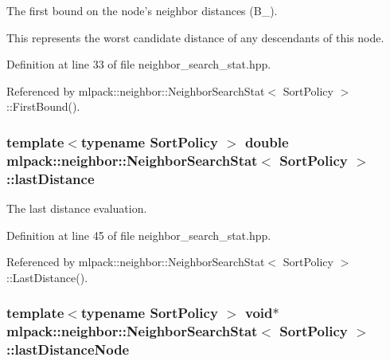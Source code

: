 The first bound on the node's neighbor distances (B\-\_). 

This represents the worst candidate distance of any descendants of this node. 

Definition at line 33 of file neighbor\-\_\-search\-\_\-stat.\-hpp.



Referenced by mlpack\-::neighbor\-::\-Neighbor\-Search\-Stat$<$ Sort\-Policy $>$\-::\-First\-Bound().

\subsubsection[{last\-Distance}]{\setlength{\rightskip}{0pt plus 5cm}template$<$typename Sort\-Policy $>$ double {\bf mlpack\-::neighbor\-::\-Neighbor\-Search\-Stat}$<$ Sort\-Policy $>$\-::last\-Distance\hspace{0.3cm}{\ttfamily [private]}}\label{classmlpack_1_1neighbor_1_1NeighborSearchStat_ac009992f1081ef962a16023f8e00c691}


The last distance evaluation. 



Definition at line 45 of file neighbor\-\_\-search\-\_\-stat.\-hpp.



Referenced by mlpack\-::neighbor\-::\-Neighbor\-Search\-Stat$<$ Sort\-Policy $>$\-::\-Last\-Distance().

\subsubsection[{last\-Distance\-Node}]{\setlength{\rightskip}{0pt plus 5cm}template$<$typename Sort\-Policy $>$ void$\ast$ {\bf mlpack\-::neighbor\-::\-Neighbor\-Search\-Stat}$<$ Sort\-Policy $>$\-::last\-Distance\-Node\hspace{0.3cm}{\ttfamily [private]}}\label{classmlpack_1_1neighbor_1_1NeighborSearchStat_af4b91531b548385de908d6597c7c4923}


